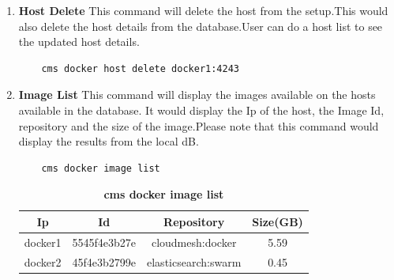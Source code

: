 \documentclass[9pt,twocolumn,twoside]{../../styles/osajnl}
\begin{document}
\begin{enumerate}
    \item \textbf{Host Delete}
    This command will delete the host from the setup.This would also delete the host details from the database.User can do a host list to see the updated host details.
    \begin{verbatim}
    cms docker host delete docker1:4243
    \end{verbatim}    
    \item \textbf{Image List}
    This command will display the images available on the hosts available in the database.
    It would display the Ip of the host, the Image Id, repository and the size of the image.Please note that this command would display the results from the local dB.
    \begin{verbatim}
    cms docker image list
    \end{verbatim}   
    \begin{table}[h!]
     \caption{\bf cms docker image list }
     \begin{tabular}{cccc}
     \hline
      Ip & Id & Repository & Size(GB)\\
      \hline
      docker1 & 5545f4e3b27e & cloudmesh:docker & 5.59 \\
      docker2 & 45f4e3b2799e & elasticsearch:swarm & 0.45 \\
     \hline
     \end{tabular}
     \label{tab:tab2}
     \end{table}
     

\end{enumerate}
\end{document}
